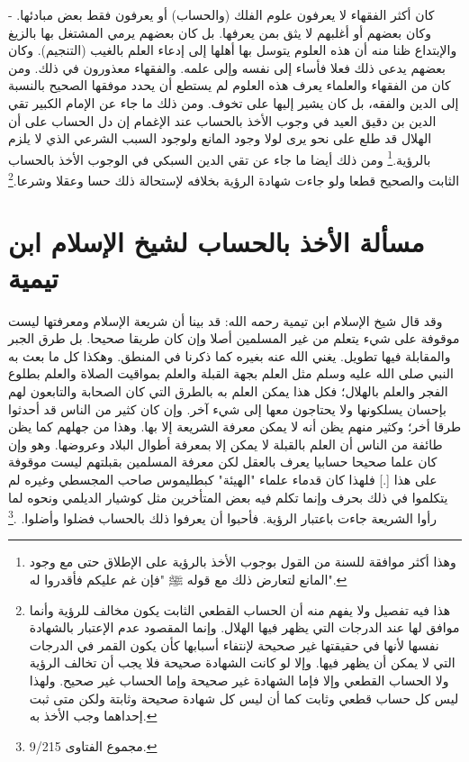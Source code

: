 - كان أكثر الفقهاء لا يعرفون علوم الفلك (والحساب) أو يعرفون فقط بعض مبادئها. وكان بعضهم أو أغلبهم لا يثق بمن يعرفها. بل كان بعضهم يرمي المشتغل بها بالزيغ والإبتداع ظنا منه أن هذه العلوم يتوسل بها أهلها إلى إدعاء العلم بالغيب (التنجيم). وكان بعضهم يدعى ذلك فعلا فأساء إلى نفسه وإلى علمه. والفقهاء معذورون في ذلك. ومن كان من الفقهاء والعلماء يعرف هذه العلوم لم يستطع أن يحدد موفقها الصحيح بالنسبة إلى الدين والفقه، بل كان يشير إليها على تخوف. ومن ذلك ما جاء عن الإمام الكبير تقي الدين بن دقيق العيد في وجوب الأخذ بالحساب عند الإغمام إن دل الحساب على أن الهلال قد طلع على نحو يرى لولا وجود المانع ولوجود السبب الشرعي الذي لا يلزم بالرؤية.\footnote{وهذا أكثر موافقة للسنة من القول بوجوب الأخذ بالرؤية على الإطلاق حتى مع وجود المانع لتعارض ذلك مع قوله ﷺ "فإن غم عليكم فأقدروا له".} ومن ذلك أيضا ما جاء عن تقي الدين السبكي في الوجوب الأخذ بالحساب الثابت والصحيح قطعا ولو جاءت شهادة الرؤية بخلافه لإستحالة ذلك حسا وعقلا وشرعا.\footnote{هذا فيه تفصيل ولا يفهم منه أن الحساب القطعي الثابت يكون مخالف للرؤية وأنما موافق لها عند الدرجات التي يظهر فيها الهلال. وإنما المقصود عدم الإعتبار بالشهادة نفسها لأنها في حقيقتها غير صحيحة لإنتفاء أسبابها كأن يكون القمر في الدرجات التي لا يمكن أن يظهر فيها. وإلا لو كانت الشهادة صحيحة فلا يجب أن تخالف الرؤية ولا الحساب القطعي وإلا فإما الشهادة غير صحيحة وإما الحساب غير صحيح. ولهذا ليس كل حساب قطعي وثابت كما أن ليس كل شهادة صحيحة وثابتة ولكن متى ثبت إحداهما وجب الأخذ به.}

\section{مسألة الأخذ بالحساب لشيخ الإسلام ابن تيمية}
\label{sec:app_shuhur_ibnTaimia}

وقد  قال شيخ الإسلام ابن تيمية رحمه الله: قد بينا أن شريعة الإسلام ومعرفتها ليست موقوفة على شيء يتعلم من غير المسلمين أصلا وإن كان طريقا صحيحا. بل طرق الجبر والمقابلة فيها تطويل. يغني الله عنه بغيره كما ذكرنا في المنطق. وهكذا كل ما بعث به النبي صلى الله عليه وسلم مثل العلم بجهة القبلة والعلم بمواقيت الصلاة والعلم بطلوع الفجر والعلم بالهلال؛ فكل هذا يمكن العلم به بالطرق التي كان الصحابة والتابعون لهم بإحسان يسلكونها ولا يحتاجون معها إلى شيء آخر. وإن كان كثير من الناس قد أحدثوا طرقا أخر؛ وكثير منهم يظن أنه لا يمكن معرفة الشريعة إلا بها. وهذا من جهلهم كما يظن طائفة من الناس أن العلم بالقبلة لا يمكن إلا بمعرفة أطوال البلاد وعروضها. وهو وإن كان علما صحيحا حسابيا يعرف بالعقل لكن معرفة المسلمين بقبلتهم ليست موقوفة على هذا [.] فلهذا كان قدماء علماء "الهيئة" كبطليموس صاحب المجسطي وغيره لم يتكلموا في ذلك بحرف وإنما تكلم فيه بعض المتأخرين مثل كوشيار الديلمي ونحوه لما رأوا الشريعة جاءت باعتبار الرؤية. فأحبوا أن يعرفوا ذلك بالحساب فضلوا وأضلوا. \href{https://shamela.ws/book/7289/4480#p1}{\faExternalLink} \cite{ibnTaimia_Majmoo}.\footnote{مجموع الفتاوى 9/215.} 


